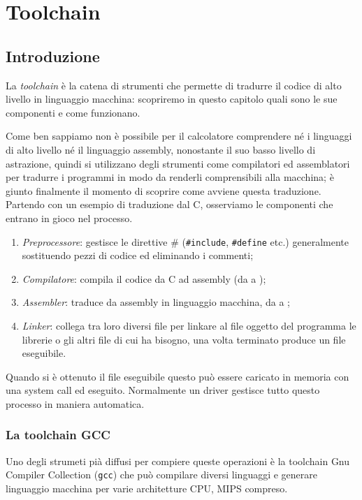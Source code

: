\documentclass[class=book, crop=false, oneside]{standalone}
\begin{document}
\chapter{Toolchain}\label{ch:tool}

\section{Introduzione}
La \emph{toolchain} è la catena di strumenti che permette di tradurre il codice di alto livello in linguaggio macchina: scopriremo in questo capitolo quali sono le sue componenti e come funzionano.

Come ben sappiamo non è possibile per il calcolatore comprendere né i linguaggi di alto livello né il linguaggio assembly, nonostante il suo basso livello di astrazione, quindi si utilizzano degli strumenti come compilatori ed assemblatori per tradurre i programmi in modo da renderli comprensibili alla macchina; è giunto finalmente il momento di scoprire come avviene questa traduzione. Partendo con un esempio di traduzione dal C, osserviamo le componenti che entrano in gioco nel processo.
\begin{enumerate}
	\item \emph{Preprocessore}: gestisce le direttive \# (\texttt{#include}, \texttt{#define} etc.) generalmente sostituendo pezzi di codice ed eliminando i commenti;
	\item \emph{Compilatore}: compila il codice da C ad assembly (da  a );
	\item \emph{Assembler}: traduce da assembly in linguaggio macchina, da  a ;
	\item \emph{Linker}: collega tra loro diversi file  per linkare al file oggetto del programma le librerie o gli altri file  di cui ha bisogno, una volta terminato produce un file eseguibile.
\end{enumerate}
Quando si è ottenuto il file eseguibile questo può essere caricato in memoria con una system call ed eseguito.
Normalmente un driver gestisce tutto questo processo in maniera automatica.

\subsection*{La toolchain GCC}
Uno degli strumeti pià diffusi per compiere queste operazioni è la toolchain Gnu Compiler Collection (\texttt{gcc}) che può compilare diversi linguaggi e generare linguaggio macchina per varie architetture CPU, MIPS compreso.
\end{document}
